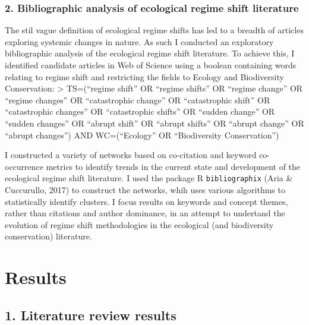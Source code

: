 \documentclass[12pt,twoside,openany]{reedthesis}
\begin{document}
\hypertarget{bibliographic-analysis-of-ecological-regime-shift-literature}{%
\subsubsection{2. Bibliographic analysis of ecological regime shift literature}\label{bibliographic-analysis-of-ecological-regime-shift-literature}}

The stil vague definition of ecological regime shifts has led to a breadth of articles exploring systemic changes in nature. As such I conducted an exploratory bibliographic analysis of the ecological regime shift literature. To achieve this, I identified candidate articles in Web of Science using a boolean containing words relating to regime shift and restricting the fields to Ecology and Biodiversity Conservation:
\textgreater{} TS=(``regime shift'' OR ``regime shifts'' OR ``regime change'' OR ``regime changes'' OR ``catastrophic change'' OR ``catastrophic shift'' OR ``catastrophic changes'' OR ``catastrophic shifts'' OR ``sudden change'' OR ``sudden changes'' OR ``abrupt shift'' OR ``abrupt shifts'' OR ``abrupt change'' OR ``abrupt changes'') AND WC=(``Ecology'' OR ``Biodiversity Conservation'')

I constructed a variety of networks based on co-citation and keyword co-occurrence metrics to identify trends in the current state and development of the ecological regime shift literature. I used the package R \texttt{bibliographix} (Aria \& Cuccurullo, 2017) to construct the networks, whih uses various algorithms to statistically identify clusters. I focus results on keywords and concept themes, rather than citations and author dominance, in an attempt to undertand the evolution of regime shift methodologies in the ecological (and biodiversity conservation) literature.

\hypertarget{results}{%
\section{Results}\label{results}}

\hypertarget{literature-review-results}{%
\subsection{1. Literature review results}\label{literature-review-results}}
\end{document}

